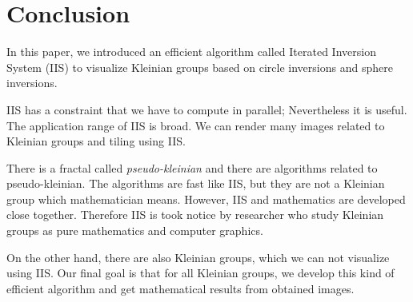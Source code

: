 
\section{Conclusion}

In this paper, we introduced an efficient algorithm
called Iterated Inversion System (IIS) to visualize Kleinian
groups based on circle inversions and sphere inversions.

IIS has a constraint that we have to compute in parallel;
Nevertheless it is useful. The application range of IIS is broad.
We can render many images related to Kleinian groups and tiling using
IIS.

There is a fractal called \textit{pseudo-kleinian} and
there are algorithms related to pseudo-kleinian.
The algorithms are fast like IIS, but they are not a Kleinian group which
mathematician means.
However, IIS and mathematics are developed close
together.
Therefore IIS is took notice by researcher who study Kleinian groups as
pure mathematics and computer graphics.

On the other hand, there are also Kleinian groups, which we can not
visualize using IIS.
Our final goal is that for all Kleinian groups, we develop this kind of
efficient algorithm and get mathematical results from obtained images.
